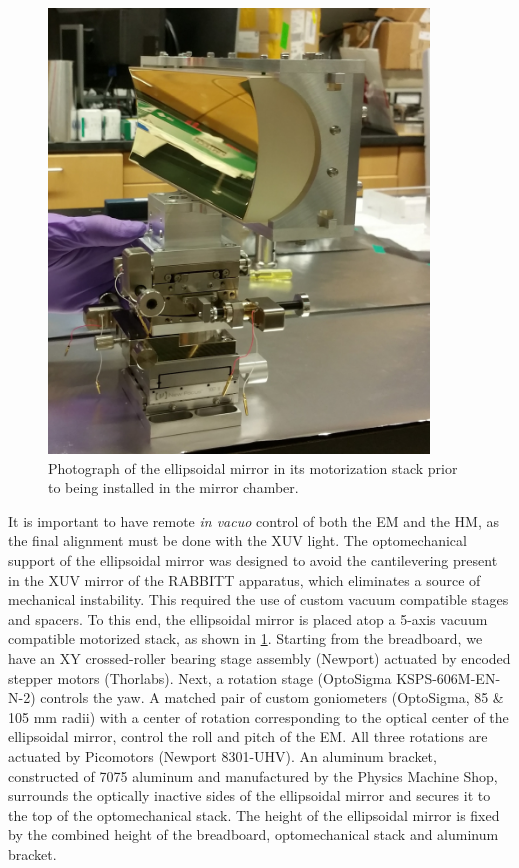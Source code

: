 \begin{figure}
	\centering
	\includegraphics[width=0.9\textwidth]{figures/chap2/EM_in_mount.jpg}
	\caption{Photograph of the ellipsoidal mirror in its motorization stack prior to being installed in the mirror chamber.}
	\label{fig:EM_in_mount}
\end{figure}

It is important to have remote \textit{in vacuo} control of both the EM and the HM, as the final alignment must be done with the XUV light. The optomechanical support of the ellipsoidal mirror was designed to avoid the cantilevering present in the XUV mirror of the RABBITT apparatus, which eliminates a source of mechanical instability. This required the use of custom vacuum compatible stages and spacers. To this end, the ellipsoidal mirror is placed atop a 5-axis vacuum compatible motorized stack, as shown in \cref{fig:EM_in_mount}. Starting from the breadboard, we have an XY crossed-roller bearing stage assembly (Newport) actuated by encoded stepper motors (Thorlabs). Next, a rotation stage (OptoSigma KSPS-606M-EN-N-2) controls the yaw. A matched pair of custom goniometers (OptoSigma, 85 \& 105 mm radii) with a center of rotation corresponding to the optical center of the ellipsoidal mirror, control the roll and pitch of the EM. All three rotations are actuated by Picomotors (Newport 8301-UHV). An aluminum bracket, constructed of 7075 aluminum and manufactured by the Physics Machine Shop, surrounds the optically inactive sides of the ellipsoidal mirror and secures it to the top of the optomechanical stack. The height of the ellipsoidal mirror is fixed by the combined height of the breadboard, optomechanical stack and aluminum bracket.

